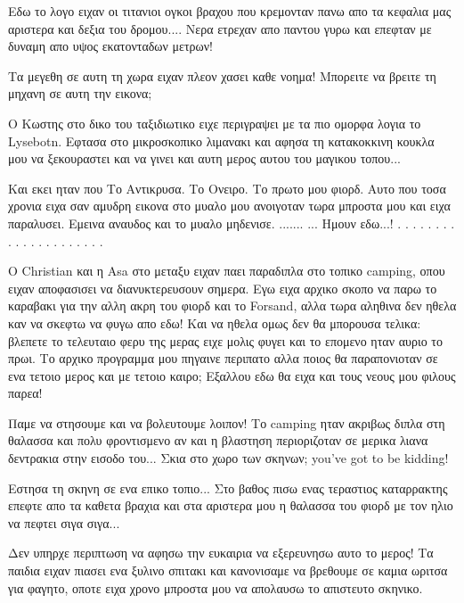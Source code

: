 
Εδω το λογο ειχαν οι τιτανιοι ογκοι βραχου που κρεμονταν πανω απο τα κεφαλια μας αριστερα και δεξια του δρομου.... 
Νερα ετρεχαν απο παντου γυρω και επεφταν με δυναμη απο υψος εκατονταδων μετρων!


Τα μεγεθη σε αυτη τη χωρα ειχαν πλεον χασει καθε νοημα!
Μπορειτε να βρειτε τη μηχανη σε αυτη την εικονα;


Ο Κωστης στο δικο του ταξιδιωτικο ειχε περιγραψει με τα πιο ομορφα λογια το Lysebotn. Εφτασα στο μικροσκοπικο λιμανακι και αφησα τη κατακοκκινη κουκλα μου να ξεκουραστει και να γινει και αυτη μερος αυτου του μαγικου τοπου...


Και εκει ηταν που Το Αντικρυσα. 
Το Ονειρο. 
Το πρωτο μου φιορδ. 
Αυτο που τοσα χρονια ειχα σαν αμυδρη εικονα στο μυαλο μου ανοιγοταν τωρα μπροστα μου και ειχα παραλυσει.
Εμεινα αναυδος και το μυαλο μηδενισε. 
.......
... Ημουν εδω...!
.
.
.
.
.
.
.
.
.
.
.
.
.
.
.
.
.
.
.
.
.



Ο Christian και η Asa στο μεταξυ ειχαν παει παραδιπλα στο τοπικο camping, οπου ειχαν αποφασισει να διανυκτερευσουν σημερα. 
Εγω ειχα αρχικο σκοπο να παρω το καραβακι για την αλλη ακρη του φιορδ και το Forsand, αλλα τωρα αληθινα δεν ηθελα καν να σκεφτω να φυγω απο εδω! 
Και να ηθελα ομως δεν θα μπορουσα τελικα: βλεπετε το τελευταιο φερυ της μερας ειχε μολις φυγει και το επομενο ηταν αυριο το πρωι.
Το αρχικο προγραμμα μου πηγαινε περιπατο αλλα ποιος θα παραπονιοταν σε ενα τετοιο μερος και με τετοιο καιρο; Εξαλλου εδω θα ειχα και τους νεους μου φιλους παρεα! 

Παμε να στησουμε και να βολευτουμε λοιπον!
Το camping ηταν ακριβως διπλα στη θαλασσα και πολυ φροντισμενο αν και η βλαστηση περιοριζοταν σε μερικα λιανα δεντρακια στην εισοδο του... Σκια στο χωρο των σκηνων; you've got to be kidding!


Εστησα τη σκηνη σε ενα επικο τοπιο... Στο βαθος πισω ενας τεραστιος καταρρακτης επεφτε απο τα καθετα βραχια και στα αριστερα μου η θαλασσα του φιορδ με τον ηλιο να πεφτει σιγα σιγα...


Δεν υπηρχε περιπτωση να αφησω την ευκαιρια να εξερευνησω αυτο το μερος! Τα παιδια ειχαν πιασει ενα ξυλινο σπιτακι και κανονισαμε να βρεθουμε σε καμια ωριτσα για φαγητο, οποτε ειχα χρονο μπροστα μου να απολαυσω το απιστευτο σκηνικο. 

